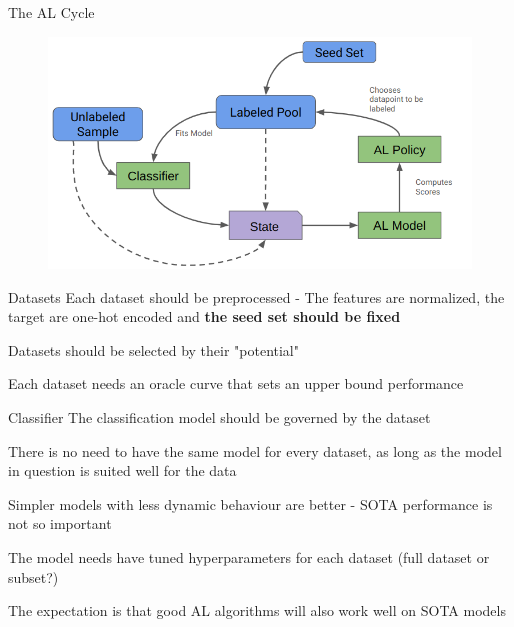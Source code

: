 \documentclass[aspectratio=169, 11pt, invertlogo]{ismll-slides}
\begin{document}
\begin{frame}[fragile]{The AL Cycle}
	\begin{figure}
		\centering
		\includegraphics[width=\linewidth]{pics/al_cycle.png}
	\end{figure}
\end{frame}


\begin{frame}[fragile]{Datasets}
	Each dataset should be preprocessed - The features are normalized, the target are one-hot encoded and \textbf{the seed set should be fixed}
	
	Datasets should be selected by their "potential"
	
	Each dataset needs an oracle curve that sets an upper bound performance
\end{frame}


\begin{frame}[fragile]{Classifier}
	The classification model should be governed by the dataset 
	
	There is no need to have the same model for every dataset, as long as the model in question is suited well for the data 
	
	Simpler models with less dynamic behaviour are better - SOTA performance is not so important
	
	The model needs have tuned hyperparameters for each dataset (full dataset or subset?)
	
	The expectation is that good AL algorithms will also work well on SOTA models
\end{frame}
\end{document}
